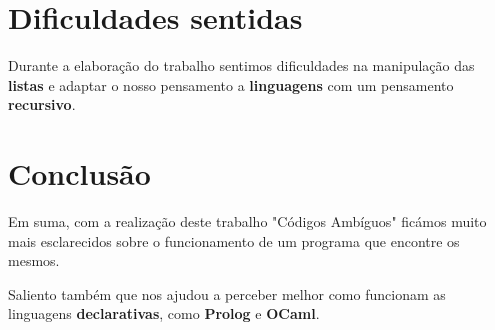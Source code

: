 \documentclass[11pt]{article}   %
\begin{document}
\section{Dificuldades sentidas}

Durante a elaboração do trabalho sentimos dificuldades na manipulação das \textbf{listas} e
adaptar o nosso pensamento a \textbf{linguagens} com um pensamento \textbf{recursivo}.
\section{Conclusão} %
\hspace{0,5cm}Em suma, com a realização deste trabalho "Códigos Ambíguos" ficámos muito mais 
esclarecidos sobre o funcionamento de um programa que encontre os mesmos. \par
Saliento também que nos ajudou a perceber melhor como funcionam as linguagens \textbf{declarativas},
como \textbf{Prolog} e \textbf{OCaml}.
\end{document}
